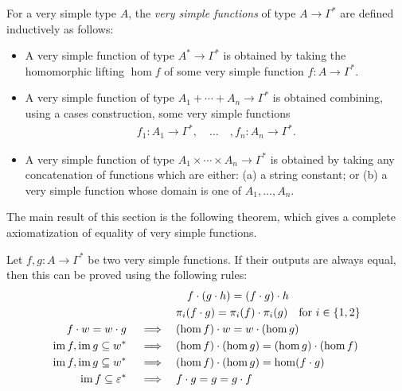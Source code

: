 \begin{definition} For a very simple type $A$, the \emph{very simple functions} of type $A \to \Gamma^*$ are defined inductively as follows:
    \begin{itemize}
        \item A very simple function of type 
$
        A^* \to \Gamma^*
 $
        is obtained by taking the homomorphic lifting $\hom f$ of some very simple function $f : A \to \Gamma^*$. 
        \item A very simple function of type $A_1 + \cdots + A_n \to \Gamma^*$ is obtained combining, using a cases construction, some very simple functions 
        \begin{align*}
        f_1 : A_1 \to \Gamma^*, \quad \ldots \quad, f_n : A_n \to \Gamma^*.
        \end{align*}
        \item A very simple function of type $A_1 \times \cdots \times A_n \to \Gamma^*$ is obtained by taking any concatenation of functions which are either: (a) a string constant; or (b) a very simple function whose domain is one of $A_1,\ldots,A_n$. 
    \end{itemize}
\end{definition}



The main result of this section is the following theorem, which gives a complete axiomatization of equality of very simple functions.
\begin{theorem}
Let $f,g : A \to \Gamma^*$ be two very simple functions. If their outputs are always equal, then this  can be proved using the following rules: 
    \begin{align}
    & \quad f \cdot (g \cdot h) = (f \cdot g) \cdot h
    \label{rule:associativity}\\ 
    & \pi_i(f \cdot g) = \pi_i(f) \cdot \pi_i(g) \quad \text{for $i \in \{1,2\}$}
    \label{rule:projections-distribute-over-concatenation}
    \\
    f \cdot w = w \cdot g \quad  \implies \quad &  (\hom f) \cdot w = w \cdot (\hom g)
    \label{rule:conjugation}
    \\
    \operatorname{\mathrm{im}} f, \operatorname{\mathrm{im}} g \subseteq w^* \quad   \implies \quad & (\hom f) \cdot (\hom g) = (\hom g) \cdot (\hom f)
    \label{rule:periodic-commutativity}
    \\
    \operatorname{\mathrm{im}} f, \operatorname{\mathrm{im}} g \subseteq w^* \quad  \implies \quad & (\hom f) \cdot (\hom g)  = \hom (f \cdot g)
    \label{rule:periodic-homomorphism}\\
    \operatorname{\mathrm{im}} f \subseteq \varepsilon^* \quad \implies \quad & f \cdot g = g = g \cdot f
    \label{rule:empty-image}
    \end{align}
\end{theorem}


